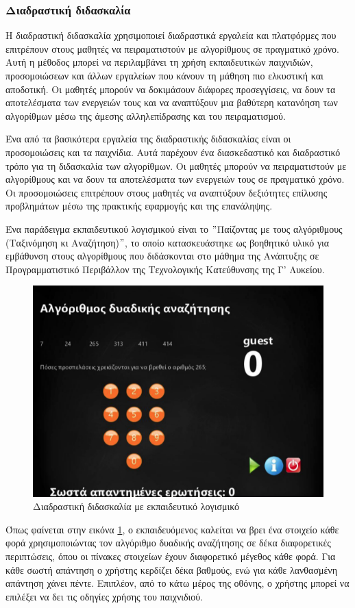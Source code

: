 \subsubsection{Διαδραστική διδασκαλία}

Η διαδραστική διδασκαλία χρησιμοποιεί διαδραστικά εργαλεία και πλατφόρμες που επιτρέπουν στους μαθητές να πειραματιστούν με αλγορίθμους σε πραγματικό χρόνο. Αυτή η μέθοδος μπορεί να περιλαμβάνει τη χρήση εκπαιδευτικών παιχνιδιών, προσομοιώσεων και άλλων εργαλείων που κάνουν τη μάθηση πιο ελκυστική και αποδοτική. Οι μαθητές μπορούν να δοκιμάσουν διάφορες προσεγγίσεις, να δουν τα αποτελέσματα των ενεργειών τους και να αναπτύξουν μια βαθύτερη κατανόηση των αλγορίθμων μέσω της άμεσης αλληλεπίδρασης και του πειραματισμού\cite{__2022}.

Ένα από τα βασικότερα εργαλεία της διαδραστικής διδασκαλίας είναι οι προσομοιώσεις και τα παιχνίδια. Αυτά παρέχουν ένα διασκεδαστικό και διαδραστικό τρόπο για τη διδασκαλία των αλγορίθμων. Οι μαθητές μπορούν να πειραματιστούν με αλγορίθμους και να δουν τα αποτελέσματα των ενεργειών τους σε πραγματικό χρόνο. Οι προσομοιώσεις επιτρέπουν στους μαθητές να αναπτύξουν δεξιότητες επίλυσης προβλημάτων μέσω της πρακτικής εφαρμογής και της επανάληψης\cite{crepinsek_note_2012}.

Ένα παράδειγμα εκπαιδευτικού λογισμικού είναι το \("\)Παίζοντας με τους αλγόριθμους (Ταξινόμηση κι Αναζήτηση)\("\), το οποίο κατασκευάστηκε ως βοηθητικό υλικό για εμβάθυνση στους αλγορίθμους που διδάσκονται στο μάθημα της Ανάπτυξης σε Προγραμματιστικό Περιβάλλον της Τεχνολογικής Κατεύθυνσης της Γ’ Λυκείου\cite{__2017}.

\begin{figure}[H]
    \centering
    \includegraphics[width=0.8\linewidth]{sections/2/images/interactive}
    \caption{Διαδραστική διδασκαλία με εκπαιδευτικό λογισμικό}
    \label{fig:interactive}
\end{figure}

Όπως φαίνεται στην εικόνα \ref{fig:interactive}, ο εκπαιδευόμενος καλείται να βρει ένα στοιχείο κάθε φορά χρησιμοποιώντας τον αλγόριθμο δυαδικής αναζήτησης σε δέκα διαφορετικές περιπτώσεις, όπου οι πίνακες στοιχείων έχουν διαφορετικό μέγεθος κάθε φορά. Για κάθε σωστή απάντηση ο χρήστης κερδίζει δέκα βαθμούς, ενώ για κάθε λανθασμένη απάντηση χάνει πέντε. Επιπλέον, από το κάτω μέρος της οθόνης, ο χρήστης μπορεί να επιλέξει να δει τις οδηγίες χρήσης του παιχνιδιού\cite{__2017}.
